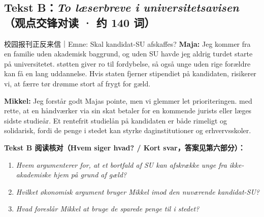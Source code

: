 \subsection*{Tekst B：\textit{To læserbreve i universitetsavisen}（观点交锋对读 · 约 140 词）}

\begin{emailbox}{校园报刊正反来信｜Emne: Skal kandidat-SU afskaffes?}
\textbf{Maja:} Jeg kommer fra en familie uden akademisk baggrund, og uden SU havde jeg aldrig turdet starte på universitetet.  støtten giver ro til fordybelse, så også unge uden rige forældre kan få en lang uddannelse. Hvis staten fjerner stipendiet på kandidaten, risikerer vi, at færre tør drømme stort af frygt for gæld.

\textbf{Mikkel:} Jeg forstår godt Majas pointe, men vi glemmer let prioriteringen.  med rette, at en håndværker via sin skat betaler for en kommende jurists eller læges sidste studieår. Et rentefrit studielån på kandidaten er  både rimeligt og solidarisk, fordi de penge i stedet kan styrke daginstitutioner og erhvervsskoler.
\end{emailbox}

\textbf{Tekst B 阅读核对（Hvem siger hvad? / Kort svar，答案见第六部分）：}
\begin{enumerate}
  \item \textit{Hvem argumenterer for, at et bortfald af SU kan afskrække unge fra ikke-akademiske hjem på grund af gæld?} \underline{\hspace{2.2cm}}
  \item \textit{Hvilket økonomisk argument bruger Mikkel imod den nuværende kandidat-SU?} \\\underline{\hspace{5.0cm}}
  \item \textit{Hvad foreslår Mikkel at bruge de sparede penge til i stedet?} \underline{\hspace{4.5cm}}
\end{enumerate}

